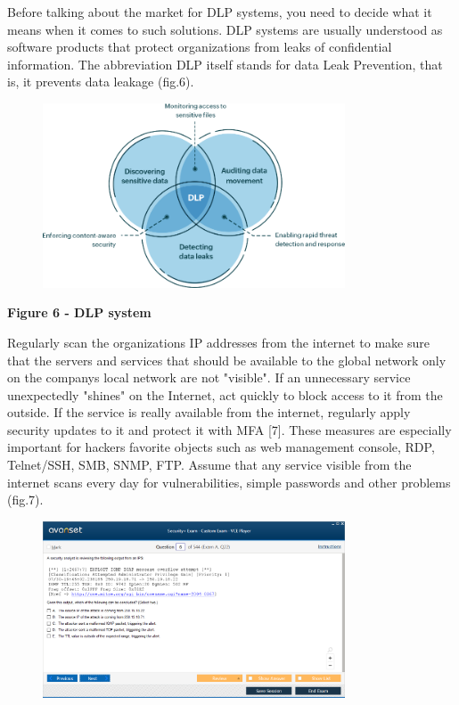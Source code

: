Before talking about the market for DLP systems, you need to decide what
it means when it comes to such solutions. DLP systems are usually
understood as software products that protect organizations from leaks of
confidential information. The abbreviation DLP itself stands for data
Leak Prevention, that is, it prevents data leakage (fig.6).

\begin{figure}[H]
	\centering
	\includegraphics[width=0.8\textwidth]{assets/68}
	\caption*{}
\end{figure}

{\bfseries Figure 6 - DLP system}

Regularly scan the organization\textquotesingle s IP addresses from the
internet to make sure that the servers and services that should be
available to the global network only on the company\textquotesingle s
local network are not "visible". If an unnecessary service unexpectedly
"shines" on the Internet, act quickly to block access to it from the
outside. If the service is really available from the internet, regularly
apply security updates to it and protect it with MFA {[}7{]}. These
measures are especially important for hackers \textquotesingle{}
favorite objects such as web management console, RDP, Telnet/SSH, SMB,
SNMP, FTP. Assume that any service visible from the internet scans every
day for vulnerabilities, simple passwords and other problems (fig.7).

\begin{figure}[H]
	\centering
	\includegraphics[width=0.8\textwidth]{assets/69}
	\caption*{}
\end{figure}

